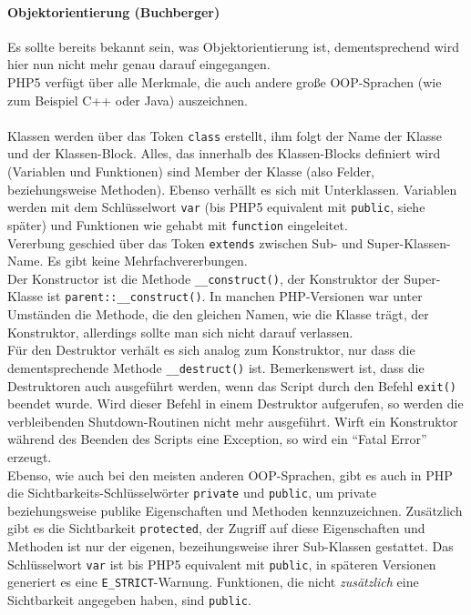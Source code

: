 \paragraph{Objektorientierung (Buchberger)\\}
Es sollte bereits bekannt sein, was Objektorientierung ist, dementsprechend wird hier nun nicht mehr genau darauf eingegangen.\\
PHP5 verfügt über alle Merkmale, die auch andere große OOP-Sprachen (wie zum Beispiel C++ oder Java) auszeichnen.\\
\\
Klassen werden über das Token \texttt{class} erstellt, ihm folgt der Name der Klasse und der Klassen-Block. Alles, das innerhalb des Klassen-Blocks definiert wird (Variablen und Funktionen) sind Member der Klasse (also Felder, beziehungsweise Methoden). Ebenso verhällt es sich mit Unterklassen. Variablen werden mit dem Schlüsselwort \texttt{var} (bis PHP5 equivalent mit \texttt{public}, siehe später) und Funktionen wie gehabt mit \texttt{function} eingeleitet.\\
Vererbung geschied über das Token \texttt{extends} zwischen Sub- und Super-Klassen-Name. Es gibt keine Mehrfachvererbungen.\\
Der Konstructor ist die Methode \texttt{\_\_construct()}, der Konstruktor der Super-Klasse ist \texttt{parent::\_\_construct()}. In manchen PHP-Versionen war unter Umständen die Methode, die den gleichen Namen, wie die Klasse trägt, der Konstruktor, allerdings sollte man sich nicht darauf verlassen.\\
Für den Destruktor verhält es sich analog zum Konstruktor, nur dass die dementsprechende Methode \texttt{\_\_destruct()} ist. Bemerkenswert ist, dass die Destruktoren auch ausgeführt werden, wenn das Script durch den Befehl \texttt{exit()} beendet wurde. Wird dieser Befehl in einem Destruktor aufgerufen, so werden die verbleibenden Shutdown-Routinen nicht mehr ausgeführt. Wirft ein Konstruktor während des Beenden des Scripts eine Exception, so wird ein \enquote{Fatal Error} erzeugt.\\
Ebenso, wie auch bei den meisten anderen OOP-Sprachen, gibt es auch in PHP die Sichtbarkeits-Schlüsselwörter \texttt{private} und \texttt{public}, um private beziehungsweise publike Eigenschaften und Methoden kennzuzeichnen. Zusätzlich gibt es die Sichtbarkeit \texttt{protected}, der Zugriff auf diese Eigenschaften und Methoden ist nur der eigenen, bezeihungsweise ihrer Sub-Klassen gestattet. Das Schlüsselwort \texttt{var} ist bis PHP5 equivalent mit \texttt{public}, in späteren Versionen generiert es eine \texttt{E\_STRICT}-Warnung. Funktionen, die nicht \textit{zusätzlich} eine Sichtbarkeit angegeben haben, sind \texttt{public}.\\
